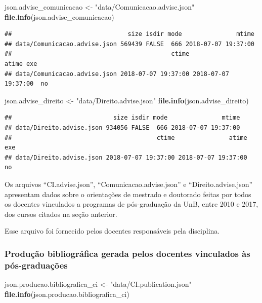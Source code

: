 \documentclass[]{article}
\newenvironment{Shaded}{\begin{snugshade}}{\end{snugshade}}
\newcommand{\KeywordTok}[1]{\textcolor[rgb]{0.13,0.29,0.53}{\textbf{#1}}}
\newcommand{\StringTok}[1]{\textcolor[rgb]{0.31,0.60,0.02}{#1}}
\newcommand{\NormalTok}[1]{#1}
\begin{document}
\begin{Shaded}
\begin{Highlighting}[]
\NormalTok{json.advise_comunicacao <-}\StringTok{ "data/Comunicacao.advise.json"}
\KeywordTok{file.info}\NormalTok{(json.advise_comunicacao)}
\end{Highlighting}
\end{Shaded}

\begin{verbatim}
##                                size isdir mode               mtime
## data/Comunicacao.advise.json 569439 FALSE  666 2018-07-07 19:37:00
##                                            ctime               atime exe
## data/Comunicacao.advise.json 2018-07-07 19:37:00 2018-07-07 19:37:00  no
\end{verbatim}

\begin{Shaded}
\begin{Highlighting}[]
\NormalTok{json.advise_direito <-}\StringTok{ "data/Direito.advise.json"}
\KeywordTok{file.info}\NormalTok{(json.advise_direito)}
\end{Highlighting}
\end{Shaded}

\begin{verbatim}
##                            size isdir mode               mtime
## data/Direito.advise.json 934056 FALSE  666 2018-07-07 19:37:00
##                                        ctime               atime exe
## data/Direito.advise.json 2018-07-07 19:37:00 2018-07-07 19:37:00  no
\end{verbatim}

Os arquivos ``CI.advise.json'', ``Comunicacao.advise.json'' e
``Direito.advise.json'' apresentam dados sobre o orientações de mestrado
e doutorado feitas por todos os docentes vinculados a programas de
pós-graduação da UnB, entre 2010 e 2017, dos cursos citados na seção
anterior.

Esse arquivo foi fornecido pelos docentes responsáveis pela disciplina.

\subsubsection{Produção bibliográfica gerada pelos docentes vinculados
às
pós-graduações}\label{producao-bibliografica-gerada-pelos-docentes-vinculados-as-pos-graduacoes}

\begin{Shaded}
\begin{Highlighting}[]
\NormalTok{json.producao.bibliografica_ci <-}\StringTok{ "data/CI.publication.json"}
\KeywordTok{file.info}\NormalTok{(json.producao.bibliografica_ci) }
\end{Highlighting}
\end{Shaded}
\end{document}
